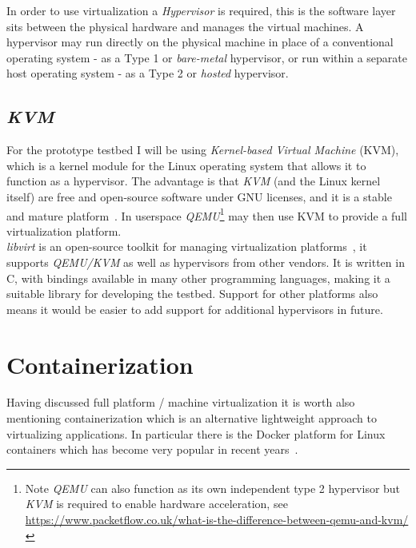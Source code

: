 \documentclass[
    author={Jacob Daniel Halsey},
    supervisor={Prof. Awais Rashid},
    degree={BSc},
    title={Building a Testbed for Evaluating Privacy Enhancing Technologies  (PETs)},
    subtitle={},
    type={software development},
    year={2021}
]{dissertation}
\begin{document}
In order to use virtualization a \emph{Hypervisor} is required, this is the software layer sits between
the physical hardware and manages the virtual machines. A hypervisor may run directly on the physical machine
in place of a conventional operating system - as a Type 1 or \emph{bare-metal} hypervisor,
or run within a separate host operating system - as a Type 2 or \emph{hosted} hypervisor. \\

\subsection{\emph{KVM}}
\label{subsect:kvm}

For the prototype testbed I will be using \emph{Kernel-based Virtual Machine} (KVM), which is a 
kernel module for the Linux operating system that allows it to function as a hypervisor. 
The advantage is that \emph{KVM} (and the Linux kernel itself) are free and open-source software 
under GNU licenses, and it is a stable and mature platform~\cite{redhat_kvm}.
In userspace \emph{QEMU}\footnote{Note \emph{QEMU} can also function as its own independent type 2 hypervisor 
	but \emph{KVM} is required to enable hardware acceleration,
see \url{https://www.packetflow.co.uk/what-is-the-difference-between-qemu-and-kvm/}}
may then use KVM to provide a full virtualization platform. \\

\emph{libvirt} is an open-source toolkit for managing virtualization platforms~\cite{libvirt},
it supports \emph{QEMU/KVM} as well as hypervisors from other vendors. It is written in C, 
with bindings available in many other programming languages, making it a suitable library for developing 
the testbed. Support for other platforms also means it would be easier to add support
for additional hypervisors in future.

\section{Containerization}
\label{sect:containerization}

Having discussed full platform / machine virtualization it is worth also mentioning containerization
which is an alternative lightweight approach to virtualizing applications. In particular 
there is the Docker platform for Linux containers which has become very popular in recent
years~\cite{zdnet_docker_2018}. \\
\end{document}
